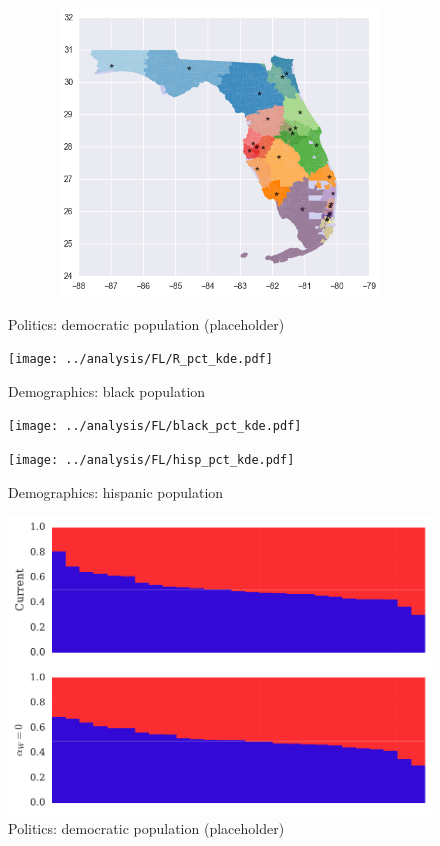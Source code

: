 \begin{figure}[htb!]
\includegraphics[width=5in,height=3in,keepaspectratio]{../maps/FL/static/0_25_after.png}
\end{figure}

\clearpage
\newpage

\begin{figure}[htb!] \centering
\caption{ Politics: democratic population (placeholder)}
\texttt{[image: ../analysis/FL/R\_pct\_kde.pdf]}
\caption{ Demographics: black population }
\texttt{[image: ../analysis/FL/black\_pct\_kde.pdf]}
\caption{ Demographics: hispanic population }
\texttt{[image: ../analysis/FL/hisp\_pct\_kde.pdf]}
\end{figure}

\clearpage
\newpage

\begin{figure}[htb!] \centering
\caption{ Politics: democratic population (placeholder)}
\includegraphics[width=6in]{../analysis/FL/barplot.pdf}
\end{figure}

